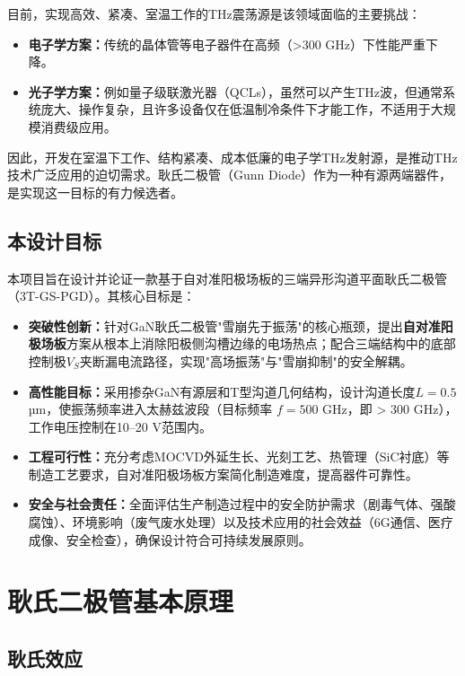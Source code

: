 \documentclass[12pt,a4paper]{article}
\begin{document}
目前，实现高效、紧凑、室温工作的THz震荡源是该领域面临的主要挑战：

\begin{itemize}
    \item \textbf{电子学方案：}传统的晶体管等电子器件在高频（>300 GHz）下性能严重下降。
    \item \textbf{光子学方案：}例如量子级联激光器（QCLs），虽然可以产生THz波，但通常系统庞大、操作复杂，且许多设备仅在低温制冷条件下才能工作，不适用于大规模消费级应用\cite{belkin2007terahertz}。
\end{itemize}

因此，开发在室温下工作、结构紧凑、成本低廉的电子学THz发射源，是推动THz技术广泛应用的迫切需求。耿氏二极管（Gunn Diode）作为一种有源两端器件，是实现这一目标的有力候选者。

\subsection{本设计目标}

本项目旨在设计并论证一款基于自对准阳极场板的三端异形沟道平面耿氏二极管（3T-GS-PGD）。其核心目标是：

\begin{itemize}
    \item \textbf{突破性创新：}针对GaN耿氏二极管"雪崩先于振荡"的核心瓶颈，提出\textbf{自对准阳极场板}方案从根本上消除阳极侧沟槽边缘的电场热点；配合三端结构中的底部控制极$V_S$夹断漏电流路径，实现"高场振荡"与"雪崩抑制"的安全解耦。
    \item \textbf{高性能目标：}采用掺杂GaN有源层和T型沟道几何结构，设计沟道长度$L = 0.5$ µm，使振荡频率进入太赫兹波段（目标频率 $f = 500$ GHz，即 > 300 GHz），工作电压控制在10--20 V范围内。
    \item \textbf{工程可行性：}充分考虑MOCVD外延生长、光刻工艺、热管理（SiC衬底）等制造工艺要求，自对准阳极场板方案简化制造难度，提高器件可靠性。
    \item \textbf{安全与社会责任：}全面评估生产制造过程中的安全防护需求（剧毒气体、强酸腐蚀）、环境影响（废气废水处理）以及技术应用的社会效益（6G通信、医疗成像、安全检查），确保设计符合可持续发展原则。
\end{itemize}

\clearpage
\section{耿氏二极管基本原理}

\subsection{耿氏效应}
\end{document}
